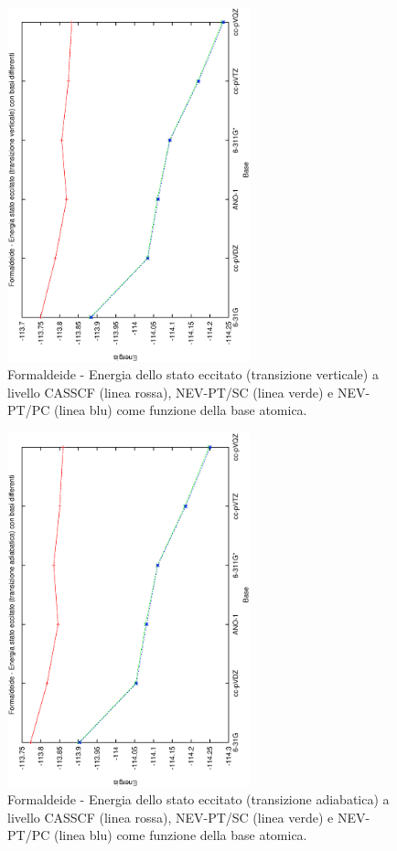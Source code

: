 \begin{figure}[ht]
\begin{center}
\includegraphics[angle=270,width=7cm,keepaspectratio]{immagini/formaldeide/vert.eps}
\parbox[h]{12cm}{
\caption{\small Formaldeide - Energia dello stato eccitato (transizione verticale)
a livello CASSCF (linea rossa), NEV-PT/SC (linea verde) e NEV-PT/PC (linea blu) come
funzione della base atomica. }
\label{fig:formaldeide_vert}
}
\end{center}
\end{figure}
\begin{figure}[ht]
\begin{center}
\includegraphics[angle=270,width=7cm,keepaspectratio]{immagini/formaldeide/adiab.eps}
\parbox[h]{12cm}{
\caption{\small Formaldeide - Energia dello stato eccitato (transizione
adiabatica) a livello CASSCF (linea rossa), NEV-PT/SC (linea verde) e NEV-PT/PC (linea blu) come
funzione della base atomica. }
\label{fig:formaldeide_adiab}
}
\end{center}
\end{figure}
\clearpage

